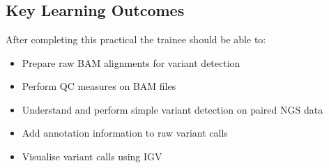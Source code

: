 



\chapter{\moduleTitle}


\newpage


\section{Key Learning Outcomes}

After completing this practical the trainee should be able to:

\begin{itemize}
  \item Prepare raw BAM alignments for variant detection 
  \item Perform QC measures on BAM files
  \item Understand and perform simple variant detection on paired NGS data 
  \item Add annotation information to raw variant calls
  \item Visualise variant calls using IGV
\end{itemize}

